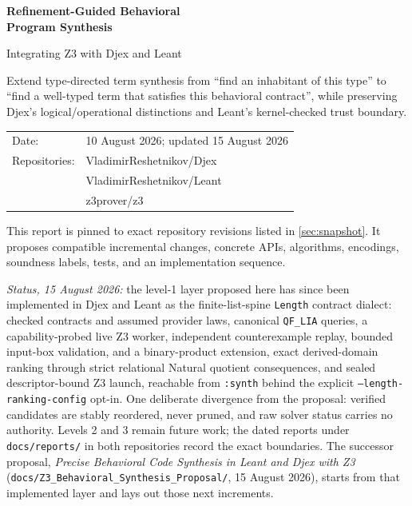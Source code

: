 \documentclass[11pt,oneside]{article}
\newcommand{\repo}[1]{\textsf{#1}}
\newcommand{\code}[1]{\texttt{#1}}
\begin{document}
\begin{titlepage}
  \thispagestyle{empty}
  \vspace*{14mm}
  {\sffamily\bfseries\fontsize{29}{34}\selectfont\color{Ink}
    Refinement-Guided Behavioral\\[2mm]
    Program Synthesis\par}
  \vspace{5mm}
  {\sffamily\fontsize{18}{23}\selectfont\color{Accent}
    Integrating Z3 with Djex and Leant\par}
  \vspace{13mm}

  \begin{keybox}[title=Design objective]
  Extend type-directed term synthesis from ``find an inhabitant of this type'' to
  ``find a well-typed term that satisfies this behavioral contract'', while preserving
  Djex's logical/operational distinctions and Leant's kernel-checked trust boundary.
  \end{keybox}

  \vfill
  \begin{tabular}{@{}ll@{}}
    \textsf{Date:} & 10 August 2026; updated 15 August 2026 \\
    \textsf{Repositories:} & \repo{VladimirReshetnikov/Djex} \\
                           & \repo{VladimirReshetnikov/Leant} \\
                           & \repo{z3prover/z3}
  \end{tabular}
  \vspace{12mm}

  {\small\color{Muted}
  This report is pinned to exact repository revisions listed in \cref{sec:snapshot}.
  It proposes compatible incremental changes, concrete APIs, algorithms, encodings,
  soundness labels, tests, and an implementation sequence.}

  \vspace{4mm}
  {\small\color{Muted}
  \emph{Status, 15 August 2026:} the level-1 layer proposed here has since been
  implemented in Djex and Leant as the finite-list-spine \code{Length} contract
  dialect: checked contracts and assumed provider laws, canonical
  \code{QF\_LIA} queries, a capability-probed live Z3 worker, independent
  counterexample replay, bounded input-box validation, and a binary-product
  extension, exact derived-domain ranking through strict relational Natural
  quotient consequences, and sealed descriptor-bound Z3 launch, reachable from
  \code{:synth} behind the explicit
  \code{--length-ranking-config} opt-in.  One deliberate divergence from the
  proposal: verified candidates are stably reordered, never pruned, and raw
  solver status carries no authority.  Levels 2 and 3 remain future work; the
  dated reports under \code{docs/reports/} in both repositories record the
  exact boundaries.  The successor proposal,
  \emph{Precise Behavioral Code Synthesis in Leant and Djex with Z3}
  (\code{docs/Z3\_Behavioral\_Synthesis\_Proposal/}, 15 August 2026), starts
  from that implemented layer and lays out those next increments.

}
\end{titlepage}
\end{document}

